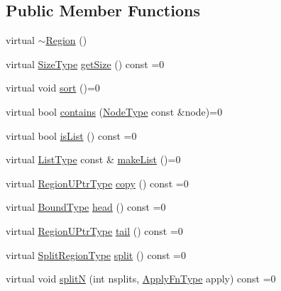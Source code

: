 \subsection*{Public Member Functions}
\begin{DoxyCompactItemize}
\item 
virtual \hyperlink{structvt_1_1group_1_1region_1_1_region_adb017be8010659a0da19f66c8265fe10}{$\sim$\+Region} ()
\item 
virtual \hyperlink{structvt_1_1group_1_1region_1_1_region_a9bb381adf31111aae34dbc644bad6c1f}{Size\+Type} \hyperlink{structvt_1_1group_1_1region_1_1_region_ab0db5f78c57943b4b9973ba2c7c619f7}{get\+Size} () const =0
\item 
virtual void \hyperlink{structvt_1_1group_1_1region_1_1_region_a169304bf82a87ff958333595bed2603d}{sort} ()=0
\item 
virtual bool \hyperlink{structvt_1_1group_1_1region_1_1_region_a1e0ebd7367476fb397faf06a03b5583c}{contains} (\hyperlink{namespacevt_a866da9d0efc19c0a1ce79e9e492f47e2}{Node\+Type} const \&node)=0
\item 
virtual bool \hyperlink{structvt_1_1group_1_1region_1_1_region_a5c05e6ebee5a6d7e77d9ebf33c9ff50c}{is\+List} () const =0
\item 
virtual \hyperlink{structvt_1_1group_1_1region_1_1_region_a4e35b2fc6dca06aca0b7bc0e19b35c5a}{List\+Type} const  \& \hyperlink{structvt_1_1group_1_1region_1_1_region_ac85c027b3c402c712c888aefc198c6be}{make\+List} ()=0
\item 
virtual \hyperlink{structvt_1_1group_1_1region_1_1_region_ae5f42cf159116a3cf8bd65423eb01037}{Region\+U\+Ptr\+Type} \hyperlink{structvt_1_1group_1_1region_1_1_region_a040d20a4f8c6fa351d7fe1cbfcae3a03}{copy} () const =0
\item 
virtual \hyperlink{structvt_1_1group_1_1region_1_1_region_abf426ff85bed72c1c6524fad6a9f1751}{Bound\+Type} \hyperlink{structvt_1_1group_1_1region_1_1_region_a09d21333389937f11dd5d3e6ba566c54}{head} () const =0
\item 
virtual \hyperlink{structvt_1_1group_1_1region_1_1_region_ae5f42cf159116a3cf8bd65423eb01037}{Region\+U\+Ptr\+Type} \hyperlink{structvt_1_1group_1_1region_1_1_region_a7d5bc5711c1b7954e27defa4dc94af40}{tail} () const =0
\item 
virtual \hyperlink{structvt_1_1group_1_1region_1_1_region_ab8d05c0978c7f38292a9ed5a15498a4b}{Split\+Region\+Type} \hyperlink{structvt_1_1group_1_1region_1_1_region_a2cbbbff6358f0f63235d95501858f512}{split} () const =0
\item 
virtual void \hyperlink{structvt_1_1group_1_1region_1_1_region_ae8660d4218b57e91664dedfa807cd936}{splitN} (int nsplits, \hyperlink{structvt_1_1group_1_1region_1_1_region_a7c9e99b1157d2fe2f3e6fc36a1463a96}{Apply\+Fn\+Type} apply) const =0
\end{DoxyCompactItemize}


